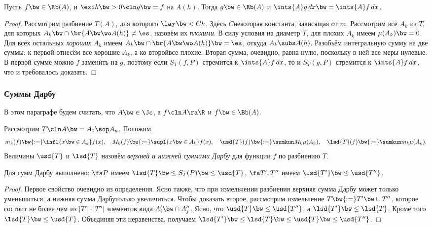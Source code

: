 \documentclass[a4paper]{article}
\begin{document}
\begin{theorem}\label{ah.bounded.function}
Пусть $f \bw\in \Rb(A)$, и $\exi h \bw> 0\cln g\bw=f$ на $A(h)$. Тогда $g \bw\in\Rb(A)$ и
$\ints{A}g\,dx \bw= \ints{A} f\,d x$.
\end{theorem}
\begin{proof}
Рассмотрим разбиение $T(A)$, для которого $\la_T \bw< Ch$. Здесь $C$\т некоторая константа, зависящая от $m$.
Рассмотрим все $A_k$ из $T$, для которых $A_k \bw\cap \br{A \bw\wo A(h)} \neq \es$, назовём их
\emph{плохими}. В силу условия на диаметр $T$, для плохих $A_k$ имеем $\mu(A_k) \bw= 0$. Для всех остальных
\emph{хороших} $A_k$ имеем $A_k \bw\cap\br{A \bw\wo A(h)} \bw= \es$, откуда $A_k \subs A(h)$. Разобьём
интегральную сумму на две суммы: к первой отнесём все хорошие $A_k$, а ко второй\т все плохие. Вторая сумма,
очевидно, равна нулю, поскольку в ней все меры нулевые. В первой сумме можно $f$ заменить на $g$, поэтому
если $S_T(f, P)$ стремится к $\ints{A}f \,dx$, то и $S_T(g,P)$ стремится к $\ints{A}f \,dx$, что и
требовалось доказать.
\end{proof}

\subsubsection{Суммы Дарбу}

В этом параграфе будем считать, что $A \bw\in \Jc$, а $f\cln A \ra \R$ и $f\bw\in \Bb(A)$.

\begin{df}
Рассмотрим $T\cln A \bw= A_1\sop A_n$. Положим
$$m_k(f) \bw{:=}\infl{x\bw\in A_k} f(x),\quad M_k(f) \bw{:=} \supl{x\bw\in A_k} f(x), \quad
\usd{T}(f) \bw{:=}\sumkun M_k\mu(A_k), \quad \lsd{T}(f) \bw{:=} \sumkun m_k \mu(A_k).$$
Величины $\usd{T}$ и $\lsd{T}$ назовём \emph{верхней и нижней суммами Дарбу} для функции $f$ по разбиению $T$.
\end{df}

\begin{lemma}
Для сумм Дарбу выполнено: $\fa P$ имеем $\lsd{T} \bw\le S_T(P) \bw\le \usd{T}$,
$\fa T', T''$ имеем $\lsd{T'} \bw\le \usd{T''}$.
\end{lemma}
\begin{proof}
Первое свойство очевидно из определения. Ясно также, что при измельчении разбиения верхняя сумма
Дарбу может только уменьшиться, а нижняя сумма Дарбу\т только увеличиться. Чтобы доказать второе,
рассмотрим измельчение $T \bw{:=} T' \bw\cup T''$, которое состоит не более чем из $|T'| \cdot |T''|$
элементов вида $A'_i \bw\cap A''_j$. Ясно, что $\usd{T} \bw\le \usd{T''}$, а $\lsd{T'}\bw\le \lsd{T}$. Кроме
того $\lsd{T} \bw\le \usd{T}$. Объединяя эти неравенства, получаем $\lsd{T'} \bw\le \lsd{T}\bw\le \usd{T}
\bw\le \usd{T''}$.
\end{proof}
\end{document}
